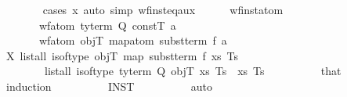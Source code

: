 \begin{isabellebody}
%
\isadelimproof
\ \ \ \ \ \ %
\endisadelimproof
%
\isatagproof
{}\isamarkupfalse%
\ {\isacharparenleft}{\kern0pt}cases\ x{\isacharparenright}{\kern0pt}\ {\isacharparenleft}{\kern0pt}auto\ simp{\isacharcolon}{\kern0pt}\ wf{\isacharunderscore}{\kern0pt}inst{\isacharunderscore}{\kern0pt}eq{\isacharunderscore}{\kern0pt}aux{\isacharparenright}{\kern0pt}%
\endisatagproof
{\isafoldproof}%
%
\isadelimproof
\isanewline
%
\endisadelimproof
\isanewline
\isanewline
\ \ \ \ \isamarkupfalse%
\ wf{\isacharunderscore}{\kern0pt}inst{\isacharunderscore}{\kern0pt}atom{\isacharcolon}{\kern0pt}\isanewline
\ \ \ \ \ \ \ {\isachardoublequoteopen}wf{\isacharunderscore}{\kern0pt}atom\ {\isacharparenleft}{\kern0pt}ty{\isacharunderscore}{\kern0pt}term\ Q\ constT{\isacharparenright}{\kern0pt}\ a{\isachardoublequoteclose}\isanewline
\ \ \ \ \ \ \ {\isachardoublequoteopen}wf{\isacharunderscore}{\kern0pt}atom\ objT\ {\isacharparenleft}{\kern0pt}map{\isacharunderscore}{\kern0pt}atom\ {\isacharparenleft}{\kern0pt}subst{\isacharunderscore}{\kern0pt}term\ f{\isacharparenright}{\kern0pt}\ a{\isacharparenright}{\kern0pt}{\isachardoublequoteclose}\isanewline
%
\isadelimproof
\ \ \ \ %
\endisadelimproof
%
\isatagproof
{}\isamarkupfalse%
\ {\isacharminus}{\kern0pt}\isanewline
\ \ \ \ \ \ \isamarkupfalse%
\ X{}{\isacharcolon}{\kern0pt}\ {\isachardoublequoteopen}list{\isacharunderscore}{\kern0pt}all{}\ {\isacharparenleft}{\kern0pt}is{\isacharunderscore}{\kern0pt}of{\isacharunderscore}{\kern0pt}type\ objT{\isacharparenright}{\kern0pt}\ {\isacharparenleft}{\kern0pt}map\ {\isacharparenleft}{\kern0pt}subst{\isacharunderscore}{\kern0pt}term\ f{\isacharparenright}{\kern0pt}\ xs{\isacharparenright}{\kern0pt}\ Ts{\isachardoublequoteclose}\ \isanewline
\ \ \ \ \ \ \ \ {\isachardoublequoteopen}list{\isacharunderscore}{\kern0pt}all{}\ {\isacharparenleft}{\kern0pt}is{\isacharunderscore}{\kern0pt}of{\isacharunderscore}{\kern0pt}type\ {\isacharparenleft}{\kern0pt}ty{\isacharunderscore}{\kern0pt}term\ Q\ objT{\isacharparenright}{\kern0pt}{\isacharparenright}{\kern0pt}\ xs\ Ts{\isachardoublequoteclose}\ \ xs\ Ts\isanewline
\ \ \ \ \ \ \ \ \isamarkupfalse%
\ that\isanewline
\ \ \ \ \ \ \ \ \isamarkupfalse%
\ induction\isanewline
\ \ \ \ \ \ \ \ \isamarkupfalse%
\ INST{\isacharprime}{\kern0pt}\isanewline
\ \ \ \ \ \ \ \ \isamarkupfalse%
\ auto\isanewline

\end{isabellebody}
